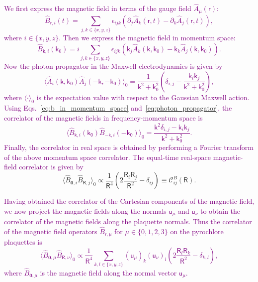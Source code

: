 \documentclass[twocolumn,superscriptaddress,amsmath,amssymb,aps,prx,nofootinbib]{revtex4-2}
\newcommand{\dual}[1]{\boldsymbol{\mathsf{#1}}}
\newcommand{\newtext}[1]{\textcolor{purple}{#1}}
\begin{document}
\newtext{We first express the magnetic field in terms of the gauge field $\hat{A}_\mu(\dual{r})$:
\begin{equation}
    \hat{B}_{\dual{r}, i} (t) = \sum_{j,k \in \{x,y,z\}} \epsilon_{ijk} \left( \partial_j \hat{A}_k(\dual{r},t) - \partial_k \hat{A}_j(\dual{r},t) \right),
\end{equation}
where $i \in \{ x,y,z\}$. Then we express the magnetic field in momentum space:
\begin{equation} \label{eq:b_in_momentum_space}
    \hat{B}_{\dual{k},i} (\mathsf{k}_0) = i\sum_{j,k \in \{x,y,z\}} \epsilon_{ijk} \left( \dual{k}_j \hat{A}_k(\dual{k}, \mathsf{k}_0) - \dual{k}_k \hat{A}_j(\dual{k}, \mathsf{k}_0) \right).
\end{equation}
Now the photon propagator in the Maxwell electrodynamics is given by
\begin{equation} \label{eq:photon_propagator}
    \langle \hat{A}_i (\dual{k}, \mathsf{k}_0) \hat{A}_j (-\dual{k}, -\mathsf{k}_0) \rangle_0 = \frac{1}{\mathsf{k}^2 + \mathsf{k}_0^2} \left( \delta_{i,j} - \frac{\mathsf{k}_i \mathsf{k}_j}{\mathsf{k}^2 + \mathsf{k}_0^2} \right),
\end{equation}
where  $\langle \cdot \rangle _0$ is the expectation value with respect to the Gaussian Maxwell action. Using Eqs.~\eqref{eq:b_in_momentum_space} and~\eqref{eq:photon_propagator}, the correlator of the magnetic fields in frequency-momentum space is
\begin{equation}
    \langle \hat{B}_{\dual{k},i} (\mathsf{k_0}) \hat{B}_{-\dual{k},i} (-\mathsf{k_0}) \rangle_0 = \frac{\mathsf{k}^2 \delta_{i,j} - \dual{k}_i\dual{k}_j}{\mathsf{k}^2 + \mathsf{k}_0^2}.
\end{equation}
Finally, the correlator in real space is obtained by performing a Fourier transform of the above momentum space correlator. The equal-time real-space magnetic-field correlator is given by~\cite{hermele2004}
}
\begin{equation}\label{eq:maxwellB2B2}
  \langle \hat{B}_{\boldsymbol{0},i} \hat{B}_{\dual{R},j} \rangle_0  \propto \frac{1}{\mathsf{R}^4} \left(2 \frac{\mathsf{R}_i \mathsf{R}_j}{\mathsf{R}^2} - \delta_{ij} \right)\equiv \mathcal{C}_{ij}^{B} (\dual{R}) .
\end{equation}

\newtext{Having obtained the correlator of the Cartesian components of the magnetic field, we now project the magnetic fields along the normals $\dual{u}_\mu$ and $\dual{u}_\nu$ to obtain the correlator of the magnetic fields along the plaquette normals. 
Thus the correlator of the magnetic field operators $\hat{B}_{\dual{r},\mu}$ for $\mu \in \{ 0,1,2,3 \}$ on the pyrochlore plaquettes is
\begin{equation}
    \langle \hat{B}_{\boldsymbol{0},\mu} \hat{B}_{\dual{R},\nu} \rangle_0  \propto \frac{1}{\mathsf{R}^4} \sum_{k,l \in \{x,y,z \} } ( \dual{u}_\mu )_k ( \dual{u}_\nu )_l  \left(  2 \frac{\mathsf{R}_l \mathsf{R}_k}{\mathsf{R}^2} -  \delta_{k,l} \right),
\end{equation}
where $\hat{B}_{\boldsymbol{0},\mu}$ is the magnetic field along the normal vector $\dual{u}_\mu$. }
\end{document}
